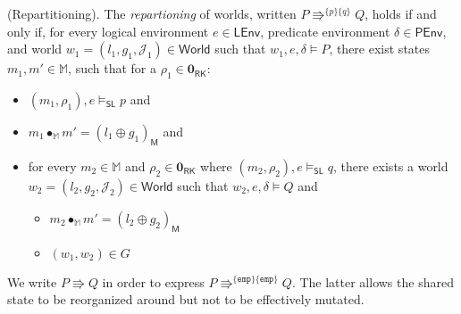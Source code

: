 \begin{defn}
	(Repartitioning).
	\label{repartitioning}
	The \emph{repartioning} of worlds, written $P \Rrightarrow^{\{p\}\{q\}} Q$, holds if and only if, for every logical environment $e \in \mathsf{LEnv}$, predicate environment $\delta \in \mathsf{PEnv}$, and world $w_1 = (l_1, g_1, \mathcal{J}_1) \in \mathsf{World}$ such that $w_1, e, \delta \vDash P$, there exist states $m_1, m' \in \mathbb{M}$, such that for a $\rho_1 \in \mathbf{0}_\mathsf{RK}$:
	\begin{itemize}
		\item $(m_1, \rho_1), e \vDash_\mathsf{SL} p$ and
		\item $m_1 \bullet_\mathbb{M} m' = (l_1 \oplus g_1)_\mathsf{M}$ and
		\item for every $m_2 \in \mathbb{M}$ and $\rho_2 \in  \mathbf{0}_\mathsf{RK}$ where $(m_2, \rho_2), e \vDash_\mathsf{SL} q$, there exists a world $w_2 = (l_2, g_2, \mathcal{J}_2) \in \mathsf{World}$ such that $w_2, e, \delta \vDash Q$ and
			\begin{itemize}
				\item $m_2 \bullet_\mathbb{M} m' = (l_2 \oplus g_2)_\mathsf{M}$
				\item $(w_1, w_2) \in G$
			\end{itemize}
	\end{itemize}
\end{defn}

We write $P \Rrightarrow Q$ in order to express $P \Rrightarrow^{\{\mathtt{emp}\}\{\mathtt{emp}\}}Q$. The latter allows the shared state to be reorganized around but not to be effectively mutated.
